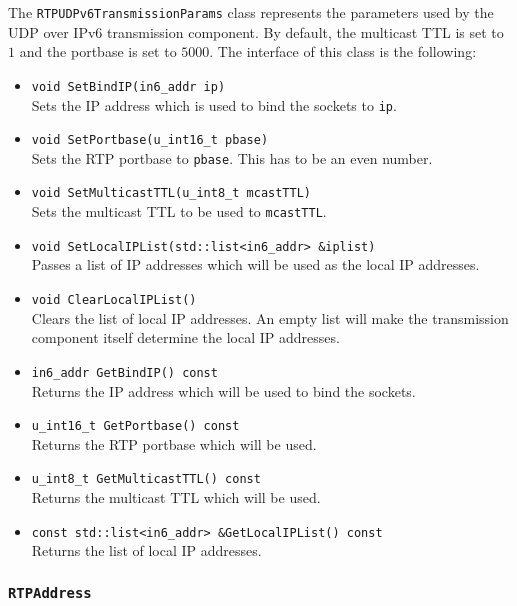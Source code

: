 \documentclass[12pt,a4paper]{article}
\newcommand{\headerfile}[1]{\marginpar{\scriptsize Header:\\{\tt #1}}}
\begin{document}
					The {\tt RTPUDPv6TransmissionParams} class represents the
					parameters used by the UDP over IPv6 transmission component.
					By default, the multicast TTL is set to $1$ and the portbase
					is set to $5000$. The interface of this class is the following:
					\begin{itemize}
						\item {\tt void SetBindIP(in6\_addr ip)}\\
							Sets the IP address which is used to bind the sockets
							to {\tt ip}.
						\item {\tt void SetPortbase(u\_int16\_t pbase)}\\
							Sets the RTP portbase to {\tt pbase}. This has to be
							an even number.
						\item {\tt void SetMulticastTTL(u\_int8\_t mcastTTL)}\\
							Sets the multicast TTL to be used to {\tt mcastTTL}.
						\item {\tt void SetLocalIPList(std::list<in6\_addr> \&iplist)}\\
							Passes a list of IP addresses which will be used as
							the local IP addresses.
						\item {\tt void ClearLocalIPList()}\\
							Clears the list of local IP addresses. An empty list
							will make the transmission component itself determine the
							local IP addresses.
						\item {\tt in6\_addr GetBindIP() const}\\
							Returns the IP address which will be used to bind the
							sockets.
						\item {\tt u\_int16\_t GetPortbase() const}\\
							Returns the RTP portbase which will be used.
						\item {\tt u\_int8\_t GetMulticastTTL() const}\\
							Returns the multicast TTL which will be used.
						\item {\tt const std::list<in6\_addr> \&GetLocalIPList() const}\\
							Returns the list of local IP addresses.
					\end{itemize}

			\subsubsection{\tt RTPAddress}\headerfile{rtpaddress.h}
\end{document}
